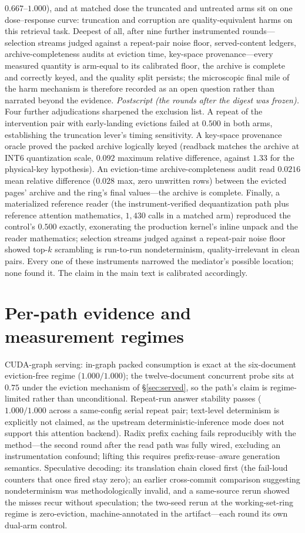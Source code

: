 \documentclass[11pt]{article}
\begin{document}
$0.667$--$1.000$), and at matched dose the truncated and untreated
arms sit on one dose--response curve: truncation and corruption are
quality-equivalent harms on this retrieval task. Deepest of all, after
nine further instrumented rounds---selection streams judged against a
repeat-pair noise floor, served-content ledgers, archive-completeness
audits at eviction time, key-space provenance---every measured
quantity is arm-equal to its calibrated floor, the archive is complete
and correctly keyed, and the quality split persists; the microscopic
final mile of the harm mechanism is therefore recorded as an open
question rather than narrated beyond the evidence. \emph{Postscript
(the rounds after the digest was frozen).} Four further adjudications
sharpened the exclusion list. A repeat of the intervention pair with
early-landing evictions failed at $0.500$ in both arms, establishing the
truncation lever's timing sensitivity. A key-space provenance oracle
proved the packed archive logically keyed (readback matches the archive
at INT6 quantization scale, $0.092$ maximum relative difference, against
$1.33$ for the physical-key hypothesis). An eviction-time
archive-completeness audit read $0.0216$ mean relative difference
($0.028$ max, zero unwritten rows) between the evicted pages' archive
and the ring's final values---the archive is complete. Finally, a
materialized reference reader (the instrument-verified dequantization
path plus reference attention mathematics, $1{,}430$ calls in a matched
arm) reproduced the control's $0.500$ exactly, exonerating the
production kernel's inline unpack and the reader mathematics; selection
streams judged against a repeat-pair noise floor showed top-$k$
scrambling is run-to-run nondeterminism, quality-irrelevant in clean
pairs. Every one of these instruments narrowed the mediator's possible
location; none found it. The claim in the main text is calibrated
accordingly.

\section{Per-path evidence and measurement regimes}
\label{app:paths}
CUDA-graph serving: in-graph packed consumption is exact at the
six-document eviction-free regime ($1.000/1.000$); the twelve-document
concurrent probe sits at $0.75$ under the eviction mechanism of
\S\ref{sec:served}, so the path's claim is regime-limited rather than
unconditional. Repeat-run answer stability passes ($1.000/1.000$ across a
same-config serial repeat pair; text-level determinism is explicitly not
claimed, as the upstream deterministic-inference mode does not support
this attention backend). Radix prefix caching fails reproducibly with the
method---the second round after the read path was fully wired, excluding
an instrumentation confound; lifting this requires
prefix-reuse--aware generation semantics. Speculative decoding: its
translation chain closed first (the fail-loud counters that once fired
stay zero); an earlier cross-commit comparison suggesting nondeterminism
was methodologically invalid, and a same-source rerun showed the misses
recur without speculation; the two-seed rerun at the working-set-ring
regime is zero-eviction, machine-annotated in the artifact---each round
its own dual-arm control.
\end{document}
